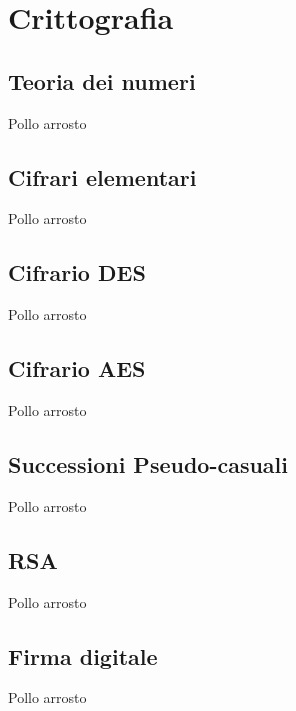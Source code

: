 
\chapter{Crittografia}

    \bigskip
    \section{Teoria dei numeri}
        Pollo arrosto

    \bigskip
    \section{Cifrari elementari}
        Pollo arrosto

    \bigskip
    \section{Cifrario DES}
        Pollo arrosto

    \bigskip
    \section{Cifrario AES}
        Pollo arrosto

    \bigskip
    \section{Successioni Pseudo-casuali}
        Pollo arrosto

    \bigskip
    \section{RSA}
        Pollo arrosto

    \bigskip
    \section{Firma digitale}
        Pollo arrosto
